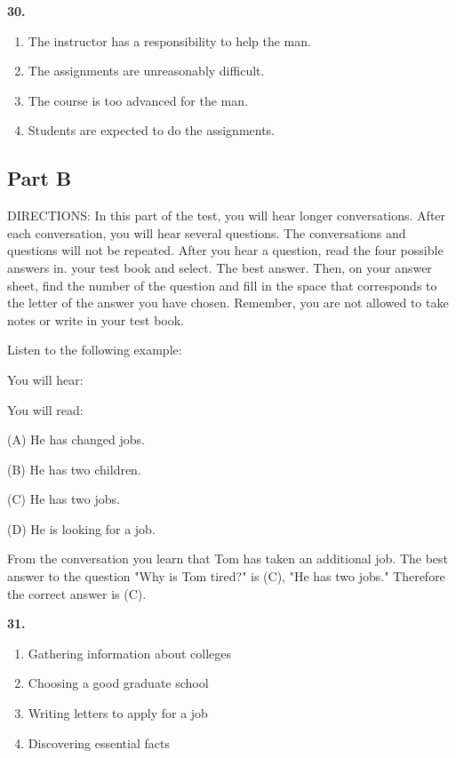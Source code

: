 \documentclass[12pt]{article}
\begin{document}
\par
\vspace{0.25\baselineskip}
\noindent\textbf{30.}
\begin{enumerate}[label=(\Alph*),leftmargin=*,itemsep=0.2em]
\item The instructor has a responsibility to help the man.
\item The assignments are unreasonably difficult.
\item The course is too advanced for the man.
\item Students are expected to do the assignments.
\end{enumerate}
\par
\vspace{0.25\baselineskip}
\subsection*{Part B}
DIRECTIONS: In this part of the test, you will hear longer conversations. After each conversation, you will hear several questions. The conversations and questions will not be repeated. After you hear a question, read the four possible answers in. your test book and select. The best answer. Then, on your answer sheet, find the number of the question and fill in the space that corresponds to the letter of the answer you have chosen. Remember, you are not allowed to take notes or write in your test book.\par
\begin{exampleblock}
Listen to the following example:\par
You will hear:\par
You will read:\par
(A) He has changed jobs.\par
(B) He has two children.\par
(C) He has two jobs.\par
(D) He is looking for a job.\par
From the conversation you learn that Tom has taken an additional job. The best answer to the question "Why is Tom tired?" is (C), "He has two jobs." Therefore the correct answer is (C).\par
\end{exampleblock}
\noindent\textbf{31.}
\begin{enumerate}[label=(\Alph*),leftmargin=*,itemsep=0.2em]
\item Gathering information about colleges
\item Choosing a good graduate school
\item Writing letters to apply for a job
\item Discovering essential facts
\end{enumerate}
\end{document}
